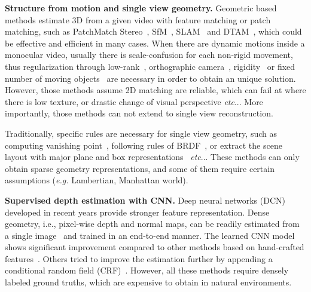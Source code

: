 \documentclass[runningheads]{llncs}
\makeatletter
\DeclareRobustCommand\onedot{\futurelet\@let@token\@onedot}
\def\onedot{\ifx\@let@token.\else.\null\fi\xspace}
\def\etc{\emph{etc}\onedot}
\makeatother
\begin{document}
\noindent\textbf{Structure from motion and single view geometry.}
Geometric based methods estimate 3D from a given video with feature matching or patch matching, such as PatchMatch Stereo~\cite{bleyer2011patchmatch}, SfM~\cite{wu2011visualsfm}, SLAM~\cite{mur2015orb,engel2014lsd} and DTAM~\cite{NewcombeLD11}, which could be effective and efficient in many cases. 
When there are dynamic motions inside a monocular video, usually there is scale-confusion for each non-rigid movement, thus regularization through low-rank~\cite{dai2014simple}, orthographic camera~\cite{taylor2010non}, rigidity~\cite{kumar2017monocular} or fixed number of moving objects~\cite{kumar2016multi} are necessary in order to obtain an unique solution. 
However, those methods assume 2D matching are reliable, which can fail at where there is low texture, or drastic change of visual perspective \etc. More importantly, those methods can not extend to single view reconstruction. 

Traditionally, specific rules are necessary for single view geometry, such as computing vanishing point~\cite{HoiemEH07}, following rules of BRDF~\cite{prados2006shape,kong2015intrinsic}, or extract the scene layout with major plane and box representations~\cite{DBLP:conf/iccv/SchwingFPU13,DBLP:conf/3dim/SrajerSPP14} \etc. These methods can only obtain sparse geometry representations, and some of them require certain assumptions (\textit{e.g.} Lambertian, Manhattan world).

\noindent\textbf{Supervised depth estimation with CNN.}
Deep neural networks (DCN) developed in recent years provide stronger feature representation. Dense geometry, i.e., pixel-wise depth and normal maps, can be readily estimated from a single image~\cite{wang2015designing,eigen2015predicting,laina2016deeper,li2017two} and trained in an end-to-end manner. The learned CNN model shows significant improvement compared to other methods based on hand-crafted features~\cite{karsch2014depth,ladicky2014pulling,zeisl2014discriminatively}. Others tried to improve the estimation further by appending a conditional random field (CRF)~\cite{DBLP:conf/cvpr/WangSLCPY15,Liu_2015_CVPR,li2015depth,peng2016depth}. However, all these methods require densely labeled ground truths, which are expensive to obtain in natural environments.
\end{document}

